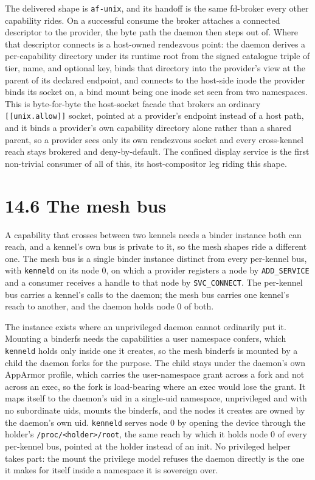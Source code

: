 The delivered shape is \texttt{af-unix}, and its handoff is the same
fd-broker every other capability rides. On a successful consume the
broker attaches a connected descriptor to the provider, the byte path
the daemon then steps out of. Where that descriptor connects is a
host-owned rendezvous point: the daemon derives a per-capability
directory under its runtime root from the signed catalogue triple of
tier, name, and optional key, binds that directory into the provider's
view at the parent of its declared endpoint, and connects to the
host-side inode the provider binds its socket on, a bind mount being one
inode set seen from two namespaces. This is byte-for-byte the
host-socket facade that brokers an ordinary
\texttt{{[}{[}unix.allow{]}{]}} socket, pointed at a provider's endpoint
instead of a host path, and it binds a provider's own capability
directory alone rather than a shared parent, so a provider sees only its
own rendezvous socket and every cross-kennel reach stays brokered and
deny-by-default. The confined display service is the first non-trivial
consumer of all of this, its host-compositor leg riding this shape.

\hypertarget{the-mesh-bus}{%
\section{14.6 The mesh bus}\label{the-mesh-bus}}

A capability that crosses between two kennels needs a binder instance
both can reach, and a kennel's own bus is private to it, so the mesh
shapes ride a different one. The mesh bus is a single binder instance
distinct from every per-kennel bus, with \texttt{kenneld} on its node 0,
on which a provider registers a node by \texttt{ADD\_SERVICE} and a
consumer receives a handle to that node by \texttt{SVC\_CONNECT}. The
per-kennel bus carries a kennel's calls to the daemon; the mesh bus
carries one kennel's reach to another, and the daemon holds node 0 of
both.

The instance exists where an unprivileged daemon cannot ordinarily put
it. Mounting a binderfs needs the capabilities a user namespace confers,
which \texttt{kenneld} holds only inside one it creates, so the mesh
binderfs is mounted by a child the daemon forks for the purpose. The
child stays under the daemon's own AppArmor profile, which carries the
user-namespace grant across a fork and not across an exec, so the fork
is load-bearing where an exec would lose the grant. It maps itself to
the daemon's uid in a single-uid namespace, unprivileged and with no
subordinate uids, mounts the binderfs, and the nodes it creates are
owned by the daemon's own uid. \texttt{kenneld} serves node 0 by opening
the device through the holder's
\texttt{/proc/\textless{}holder\textgreater{}/root}, the same reach by
which it holds node 0 of every per-kennel bus, pointed at the holder
instead of an init. No privileged helper takes part: the mount the
privilege model refuses the daemon directly is the one it makes for
itself inside a namespace it is sovereign over.

